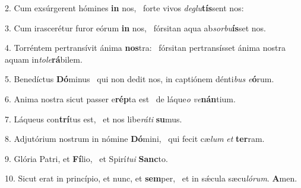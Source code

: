 2. Cum exsúrgerent hómines \textbf{in} nos, \ast\  forte vivos \textit{de}\textit{glu}\textbf{tís}sent nos:\

3. Cum irascerétur furor eórum \textbf{in} nos, \ast\  fórsitan aqua ab\textit{sor}\textit{bu}\textbf{ís}set nos.\

4. Torréntem pertransívit ánima \textbf{nos}tra: \ast\  fórsitan pertransísset ánima nostra aquam in\textit{to}\textit{le}\textbf{rá}bilem.\

5. Benedíctus \textbf{Dó}minus \ast\  qui non dedit nos, in captiónem dénti\textit{bus} \textit{e}\textbf{ó}rum.\

6. Anima nostra sicut passer e\textbf{rép}ta est \ast\  de láque\textit{o} \textit{ve}\textbf{nán}tium.\

7. Láqueus con\textbf{trí}tus est, \ast\  et nos libe\textit{rá}\textit{ti} \textbf{su}mus.\

8. Adjutórium nostrum in nómine \textbf{Dó}mini, \ast\  qui fecit cæ\textit{lum} \textit{et} \textbf{ter}ram.\

9. Glória Patri, et \textbf{Fí}lio, \ast\  et Spirí\textit{tu}\textit{i} \textbf{Sanc}to.\

10. Sicut erat in princípio, et nunc, et \textbf{sem}per, \ast\  et in sǽcula sæcu\textit{ló}\textit{rum}. \textbf{A}men.\

